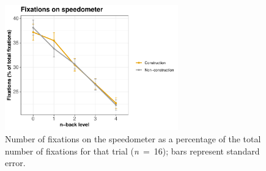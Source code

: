 \begin{figure}
  \centering
  \includegraphics[width=7.5cm]{images/speedometer_interaction.pdf}
  \caption{Number of fixations on the speedometer as a percentage of the total number of fixations for that trial (\textit{n}\ =\ 16); bars represent standard error.}
  \label{fig:fix-speedometer}
\end{figure}